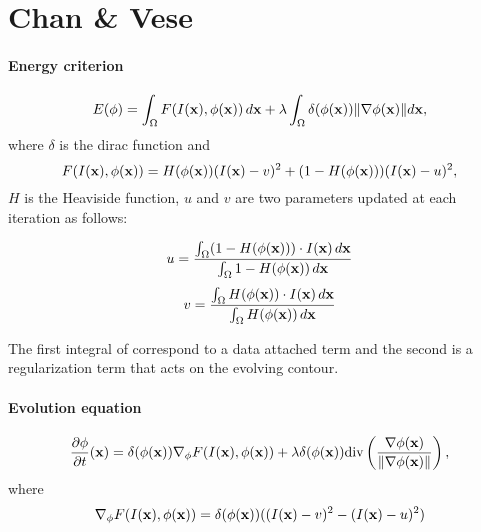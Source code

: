 \newpage
\section[Chan \& Vese]{Chan \& Vese \cite{ChanVese2001}}
\label{sec:ChanVese}

\paragraph{Energy criterion}
\begin{equation}
	\label{eq:NRJ_chanvese}
	E(\phi) = \int_\Omega F(I(\mathbf{x}), \phi(\mathbf{x})) \, d\mathbf{x} + \lambda \int_\Omega \delta(\phi(\mathbf{x})) \| \nabla \phi(\mathbf{x}) \|d\mathbf{x},
\end{equation}
where $\delta$ is the dirac function and 
\begin{equation}
	\label{eq:F_chanvese}
	F(I(\mathbf{x}),\phi(\mathbf{x})) = H(\phi(\mathbf{x}))(I(\mathbf{x}) - v)^2 + (1 - H(\phi(\mathbf{x})))(I(\mathbf{x}) - u)^2,
\end{equation}
$H$ is the Heaviside function, $u$ and $v$ are two parameters updated at each iteration as follows:

\begin{equation}
	\label{eq:u_chanvese}
	u = \frac{\int_\Omega (1 - H(\phi(\mathbf{x}))) \cdot I(\mathbf{x})\, d\mathbf{x}}{\int_\Omega 1 - H(\phi(\mathbf{x})) \, d\mathbf{x}} 
\end{equation}
\begin{equation}
	\label{eq:v_chanvese}
	v = \frac{\int_\Omega H(\phi(\mathbf{x})) \cdot I(\mathbf{x})\, d\mathbf{x}}{\int_\Omega H(\phi(\mathbf{x})) \, d\mathbf{x}} 
\end{equation}

The first integral of  correspond to a data attached term and the second is a regularization term that acts on the evolving contour.

\paragraph{Evolution equation}
\begin{equation}
	\label{eq:evol_chanvese}
	\frac{\partial \phi}{\partial t}(\mathbf{x}) = \delta(\phi(\mathbf{x})) \nabla_\phi F(I(\mathbf{x}), \phi(\mathbf{x})) + \lambda \delta(\phi(\mathbf{x})) \text{div}\left(\frac{\nabla \phi(\mathbf{x})}{\|\nabla \phi(\mathbf{x})\|}\right),
\end{equation}
where
\begin{equation}
	\label{eq:gradF_chanvese}
	\nabla_\phi F(I(\mathbf{x}),\phi(\mathbf{x})) = \delta(\phi(\mathbf{x}))((I(\mathbf{x}) - v)^2 - (I(\mathbf{x}) - u)^2)
\end{equation}

